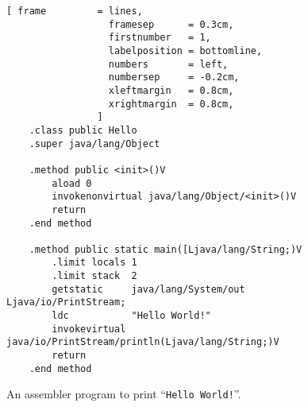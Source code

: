 \begin{figure}[!ht]
\centering
\begin{Verbatim}[ frame         = lines, 
                  framesep      = 0.3cm, 
                  firstnumber   = 1,
                  labelposition = bottomline,
                  numbers       = left,
                  numbersep     = -0.2cm,
                  xleftmargin   = 0.8cm,
                  xrightmargin  = 0.8cm,
                ]
    .class public Hello
    .super java/lang/Object
    
    .method public <init>()V
        aload 0
        invokenonvirtual java/lang/Object/<init>()V
        return
    .end method
    
    .method public static main([Ljava/lang/String;)V
        .limit locals 1
        .limit stack  2
        getstatic     java/lang/System/out Ljava/io/PrintStream;
        ldc           "Hello World!"
        invokevirtual java/io/PrintStream/println(Ljava/lang/String;)V 
        return
    .end method
\end{Verbatim}
\vspace*{-0.3cm}
\caption{An assembler program to print ``\texttt{Hello World!}''.}
\label{fig:Hello.jas}
\end{figure}

